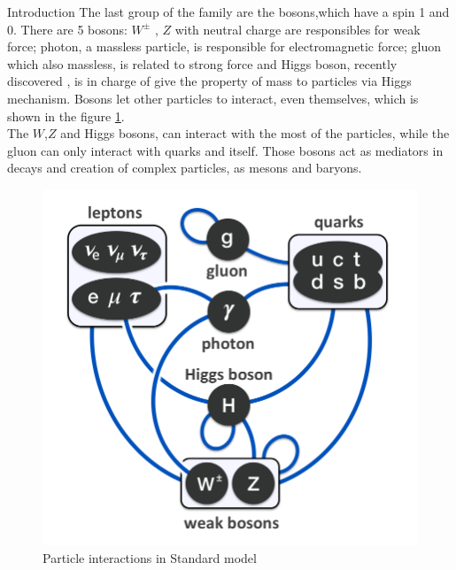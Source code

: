 \begin{chapter}{Introduction}
The last group of the family are the bosons,which have a spin 1 and 0. 
There are 5 bosons: $W^{\pm}$ , $Z$ with neutral charge are responsibles for weak force; photon, a massless particle, is responsible for electromagnetic force; gluon which also massless, is related to strong force and Higgs boson, recently discovered , is in charge of give the property of mass to particles via Higgs mechanism. Bosons let other particles to interact, even themselves, which is shown in the figure \ref{sm}. 
\\
The $W$,$Z$  and Higgs bosons, can interact with the most of the particles, while the gluon can only interact with quarks and itself.
Those bosons act as mediators in decays and creation of complex
particles, as mesons and baryons.\\


\begin{center}
    \begin{figure}[!htbp]
        \centering
        \includegraphics[scale=0.35]{Chapter1/sm.png}
        \caption{Particle interactions in Standard model}
        \label{sm}
    \end{figure}
\end{center}


\end{chapter}
